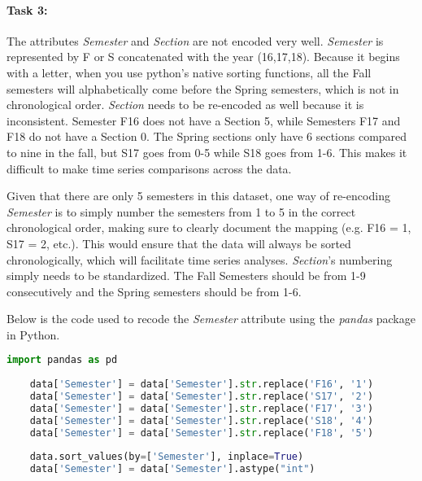 \documentclass{article}
\begin{document}
\paragraph{\textbf{Task 3:}} 
\indent The attributes \textit{Semester} and \textit{Section} are not encoded very well. \textit{Semester} is represented by F or S concatenated with the year (16,17,18). Because it begins with a letter, when you use python's native sorting functions, all the Fall semesters will alphabetically come before the Spring semesters, which is not in chronological order. \textit{Section} needs to be re-encoded as well because it is inconsistent. Semester F16 does not have a Section 5, while Semesters F17 and F18 do not have a Section 0. The Spring sections only have 6 sections compared to nine in the fall, but S17 goes from 0-5 while S18 goes from 1-6. This makes it difficult to make time series comparisons across the data. 

Given that there are only 5 semesters in this dataset, one way of re-encoding \textit{Semester} is to simply number the semesters from 1 to 5 in the correct chronological order, making sure to clearly document the mapping (e.g. F16 = 1, S17 = 2, etc.). This would ensure that the data will always be sorted chronologically, which will facilitate time series analyses. \textit{Section}'s numbering simply needs to be standardized. The Fall Semesters should be from 1-9 consecutively and the Spring semesters should be from 1-6.

Below is the code used to recode the \textit{Semester} attribute using the \textit{pandas} package in Python. 

    \begin{lstlisting}[language=Python]
    import pandas as pd
    
    data['Semester'] = data['Semester'].str.replace('F16', '1')
    data['Semester'] = data['Semester'].str.replace('S17', '2')
    data['Semester'] = data['Semester'].str.replace('F17', '3')
    data['Semester'] = data['Semester'].str.replace('S18', '4')
    data['Semester'] = data['Semester'].str.replace('F18', '5')
    
    data.sort_values(by=['Semester'], inplace=True)
    data['Semester'] = data['Semester'].astype("int")
    \end{lstlisting}
\end{document}

